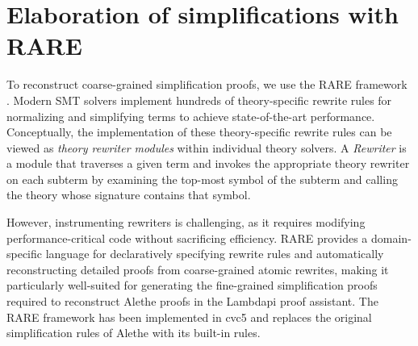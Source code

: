 \section{Elaboration of simplifications with RARE}
\label{ssec:rare-intro}

To reconstruct coarse-grained simplification proofs, we use the RARE framework \cite{rare}.
Modern SMT solvers implement hundreds of theory-specific rewrite rules for normalizing and simplifying terms to achieve state-of-the-art performance.
Conceptually, the implementation of these theory-specific rewrite rules can be viewed as \emph{theory rewriter modules} within individual theory solvers.
A \emph{Rewriter} is a module that traverses a given term and invokes the appropriate theory rewriter on each subterm by examining the top-most symbol of the subterm and calling the theory whose signature contains that symbol.

However, instrumenting rewriters is challenging, as it requires modifying performance-critical code without sacrificing efficiency.
RARE provides a domain-specific language for declaratively specifying rewrite rules and automatically reconstructing detailed proofs from coarse-grained atomic rewrites, making it particularly well-suited for generating the fine-grained simplification proofs required to reconstruct Alethe proofs in the Lambdapi proof assistant.
The RARE framework has been implemented in cvc5 and replaces the original simplification rules of Alethe with its built-in rules.


